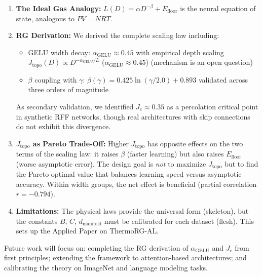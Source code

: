 \documentclass[11pt, a4paper]{article}
\theoremstyle{plain}
\begin{document}
\begin{enumerate}
\item \textbf{The Ideal Gas Analogy:} $L(D) = \alpha D^{-\beta} + E_{\mathrm{floor}}$ is the neural equation of state, analogous to $PV = NRT$.

\item \textbf{RG Derivation:} We derived the complete scaling law including:
    \begin{itemize}
    \item GELU width decay: $\alpha_{\mathrm{GELU}} \approx 0.45$ with empirical depth scaling $J_{\mathrm{topo}}(D) \propto D^{-\alpha_{\mathrm{GELU}}/L}$ ($\alpha_{\mathrm{GELU}} \approx 0.45$) (mechanism is an open question)
    \item $\beta$ coupling with $\gamma$: $\beta(\gamma) = 0.425\ln(\gamma/2.0) + 0.893$ validated across three orders of magnitude
    \end{itemize}
    As secondary validation, we identified $J_c \approx 0.35$ as a percolation critical point in synthetic RFF networks, though real architectures with skip connections do not exhibit this divergence.

\item \textbf{$J_{\mathrm{topo}}$ as Pareto Trade-Off:} Higher $J_{\mathrm{topo}}$ has opposite effects on the two terms of the scaling law: it raises $\beta$ (faster learning) but also raises $E_{\mathrm{floor}}$ (worse asymptotic error). The design goal is \emph{not} to maximize $J_{\mathrm{topo}}$ but to find the Pareto-optimal value that balances learning speed versus asymptotic accuracy. Within width groups, the net effect is beneficial (partial correlation $r = -0.794$).

\item \textbf{Limitations:} The physical laws provide the universal form (skeleton), but the constants $B$, $C$, $d_{\mathrm{manifold}}$ must be calibrated for each dataset (flesh). This sets up the Applied Paper on ThermoRG-AL.
\end{enumerate}

Future work will focus on: completing the RG derivation of $\alpha_{\mathrm{GELU}}$ and $J_c$ from first principles; extending the framework to attention-based architectures; and calibrating the theory on ImageNet and language modeling tasks.

\appendix
\end{document}
